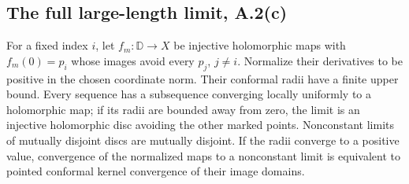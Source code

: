 \subsection{The full large-length limit, A.2(c)}

\begin{lemma}
\label{C:A2b-normal-families}
For a fixed index $i$, let $f_m:\mathbb D\to X$ be injective holomorphic maps with $f_m(0)=p_i$ whose images avoid every $p_j$, $j\ne i$. Normalize their derivatives to be positive in the chosen coordinate norm. Their conformal radii have a finite upper bound. Every sequence has a subsequence converging locally uniformly to a holomorphic map; if its radii are bounded away from zero, the limit is an injective holomorphic disc avoiding the other marked points. Nonconstant limits of mutually disjoint discs are mutually disjoint. If the radii converge to a positive value, convergence of the normalized maps to a nonconstant limit is equivalent to pointed conformal kernel convergence of their image domains.
\end{lemma}
